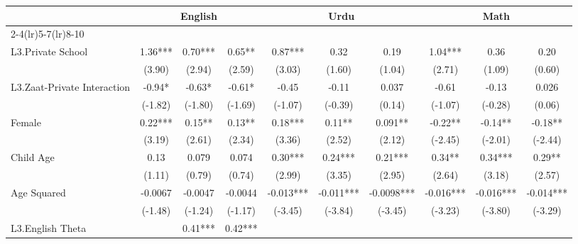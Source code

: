 \begin{sidewaystable}[htbp]\centering
\def\sym#1{\ifmmode^{#1}\else\(^{#1}\)\fi}
\caption{Scores at Class 5 \label{crosssection}}
\begin{tabular}{l*{9}{c}}
\toprule
                &\multicolumn{3}{c}{English}           &\multicolumn{3}{c}{Urdu}              &\multicolumn{3}{c}{Math}              \\\cmidrule(lr){2-4}\cmidrule(lr){5-7}\cmidrule(lr){8-10}
                &\multicolumn{1}{c}{}&\multicolumn{1}{c}{}&\multicolumn{1}{c}{}&\multicolumn{1}{c}{}&\multicolumn{1}{c}{}&\multicolumn{1}{c}{}&\multicolumn{1}{c}{}&\multicolumn{1}{c}{}&\multicolumn{1}{c}{}\\
\midrule
L3.Private School&     1.36***&     0.70***&     0.65** &     0.87***&     0.32   &     0.19   &     1.04***&     0.36   &     0.20   \\
                &   (3.90)   &   (2.94)   &   (2.59)   &   (3.03)   &   (1.60)   &   (1.04)   &   (2.71)   &   (1.09)   &   (0.60)   \\
L3.Zaat-Private Interaction&    -0.94*  &    -0.63*  &    -0.61*  &    -0.45   &    -0.11   &    0.037   &    -0.61   &    -0.13   &    0.026   \\
                &  (-1.82)   &  (-1.80)   &  (-1.69)   &  (-1.07)   &  (-0.39)   &   (0.14)   &  (-1.07)   &  (-0.28)   &   (0.06)   \\
Female          &     0.22***&     0.15** &     0.13** &     0.18***&     0.11** &    0.091** &    -0.22** &    -0.14** &    -0.18** \\
                &   (3.19)   &   (2.61)   &   (2.34)   &   (3.36)   &   (2.52)   &   (2.12)   &  (-2.45)   &  (-2.01)   &  (-2.44)   \\
Child Age       &     0.13   &    0.079   &    0.074   &     0.30***&     0.24***&     0.21***&     0.34** &     0.34***&     0.29** \\
                &   (1.11)   &   (0.79)   &   (0.74)   &   (2.99)   &   (3.35)   &   (2.95)   &   (2.64)   &   (3.18)   &   (2.57)   \\
Age Squared     &  -0.0067   &  -0.0047   &  -0.0044   &   -0.013***&   -0.011***&  -0.0098***&   -0.016***&   -0.016***&   -0.014***\\
                &  (-1.48)   &  (-1.24)   &  (-1.17)   &  (-3.45)   &  (-3.84)   &  (-3.45)   &  (-3.23)   &  (-3.80)   &  (-3.29)   \\
L3.English Theta&            &     0.41***&     0.42***&            &            &            &            &            &            \\

\end{tabular}
\end{sidewaystable}
